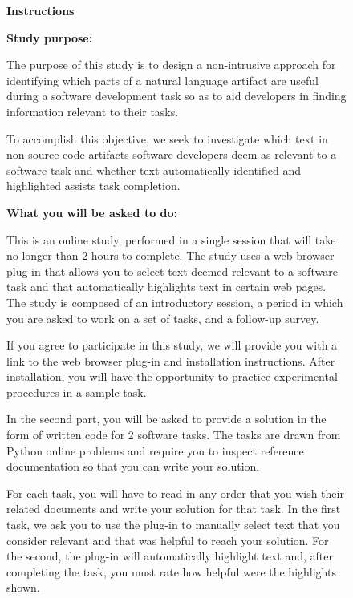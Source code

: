 

\begin{figure}
\begin{mdframed}[backgroundcolor=gray!04] 
\begin{footnotesize}

{\large \textbf{Instructions}} \bigskip


\textbf{Study purpose:} \medskip

The purpose of this study is to design a non-intrusive approach for identifying which parts of a natural language artifact are useful during a software development task so as to aid developers in finding information relevant to their tasks.

To accomplish this objective, we seek to investigate which text in non-source code artifacts software developers deem as relevant to a software task and whether text automatically identified and highlighted assists task completion.
 \medskip

\textbf{What you will be asked to do:} \medskip


This  is an online study, performed in a single session that will take no longer than 2 hours to complete. The study uses a web browser plug-in that allows you to select text deemed relevant to a software task and that automatically highlights text in certain web pages. The study is composed of an introductory session, a period in which you are asked to work on a set of tasks, and a follow-up survey.  \medskip

If you agree to participate in this study, we will provide you with a link to the web browser plug-in and installation instructions. After installation, you will have the opportunity to practice experimental procedures in a sample task. \medskip

In the second part, you will be asked to provide a solution in the form of written code for 2 software tasks. The tasks are drawn from Python online problems and require you to inspect reference documentation so that you can write your solution.  \medskip

For each task, you will have to read in any order that you wish their related documents and write your solution for that task. In the first task, we ask you to use the plug-in to manually select text that you consider relevant and that was helpful to reach your solution. For the second, the plug-in will automatically highlight text and, after completing the task, you must rate how helpful were the highlights shown.  \medskip


\end{footnotesize}
\end{mdframed}
\end{figure}
